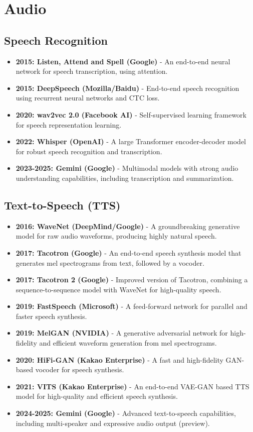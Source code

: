 \documentclass{article}
\begin{document}
\section{Audio}

\subsection{Speech Recognition}
\begin{itemize}[leftmargin=1.5em]
 \item \textbf{2015: Listen, Attend and Spell (Google)} - An end-to-end neural network for speech transcription, using attention.
 \item \textbf{2015: DeepSpeech (Mozilla/Baidu)} - End-to-end speech recognition using recurrent neural networks and CTC loss.
 \item \textbf{2020: wav2vec 2.0 (Facebook AI)} - Self-supervised learning framework for speech representation learning.
 \item \textbf{2022: Whisper (OpenAI)} - A large Transformer encoder-decoder model for robust speech recognition and transcription.
 \item \textbf{2023-2025: Gemini (Google)} - Multimodal models with strong audio understanding capabilities, including transcription and summarization.
\end{itemize}

\subsection{Text-to-Speech (TTS)}
\begin{itemize}[leftmargin=1.5em]
 \item \textbf{2016: WaveNet (DeepMind/Google)} - A groundbreaking generative model for raw audio waveforms, producing highly natural speech.
 \item \textbf{2017: Tacotron (Google)} - An end-to-end speech synthesis model that generates mel spectrograms from text, followed by a vocoder.
 \item \textbf{2017: Tacotron 2 (Google)} - Improved version of Tacotron, combining a sequence-to-sequence model with WaveNet for high-quality speech.
 \item \textbf{2019: FastSpeech (Microsoft)} - A feed-forward network for parallel and faster speech synthesis.
 \item \textbf{2019: MelGAN (NVIDIA)} - A generative adversarial network for high-fidelity and efficient waveform generation from mel spectrograms.
 \item \textbf{2020: HiFi-GAN (Kakao Enterprise)} - A fast and high-fidelity GAN-based vocoder for speech synthesis.
 \item \textbf{2021: VITS (Kakao Enterprise)} - An end-to-end VAE-GAN based TTS model for high-quality and efficient speech synthesis.
 \item \textbf{2024-2025: Gemini (Google)} - Advanced text-to-speech capabilities, including multi-speaker and expressive audio output (preview).
\end{itemize}
\end{document}
